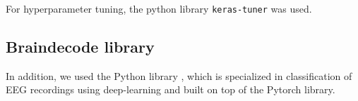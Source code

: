 

For hyperparameter tuning, the python library \texttt{keras-tuner} was used. 

\subsection{Braindecode library}

In addition, we used the Python library \cite{braindecode}, which is specialized in classification of EEG recordings using deep-learning and built on top of the Pytorch library.


